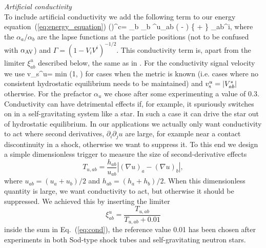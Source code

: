 \documentclass[useAMS,usenatbib]{iopart}
\begin{document}
{\em Artificial conductivity}\\
To include artificial conductivity  we add the following term to our energy equation~(\ref{eq:energy_equation})
\be
\left(\right)^{\rm c}=   \sum_b \nu_b \xi^u_{ab} \left(  - \right) \left\{  +   \right\} _{ab}^i,
\label{eq:cond}
\ee
where the $\alpha_a/\alpha_b$ are the lapse functions at the particle positions (not to be confused with $\alpha_{\rm AV}$)
and $ \Gamma= (1 - V_i V^i)^{-1/2}$. This conductivity term is, apart from the limiter $\xi^u_{ab}$ described below,
the same as in \cite{liptai19}. For the conductivity signal  velocity we use \cite{liptai19}
\be
v_{\rm s}^u= \rm{min} \left(1, \right)
\ee
for cases when the metric is known (i.e. cases where no consistent hydrostatic equilibrium needs to be maintained)
and $v_{\rm s}^u= |V^\ast_{ab}|$ otherwise. For the prefactor $\alpha_u$ we chose after some experimenting a value of 0.3.\\
Conductivity can have detrimental effects if, for example, it spuriously switches on in a self-gravitating system
like a star. In such a case it can drive the star out of hydrostatic equilibrium.  In our applications we actually only want conductivity to act
where second derivatives, $\partial_i \partial_j u$ are large, for example near a contact discontinuity in a shock, otherwise
we want to suppress it. To this end we design a simple dimensionless trigger to measure the size of second-derivative effects
\begin{equation}
T_{u, ab}= \frac{h_{ab}}{u_{ab}} | (\nabla u)_a - (\nabla u)_b|,
\end{equation}
where $u_{ab}= (u_a+u_b)/2$ and $h_{ab}= (h_a+h_b)/2$. When this dimensionless quantity is large,
 we want conductivity to act, but otherwise it should be suppressed.
We achieved this by inserting the limiter
\begin{equation}
\xi^u_{ab}= \frac{T_{u, ab}}{T_{u, ab} + 0.01}
\end{equation}
inside the sum in Eq.~(\ref{eq:cond}), the reference value 0.01 has been chosen after experiments
in both Sod-type shock tubes and self-gravitating neutron stars.\\
\end{document}
